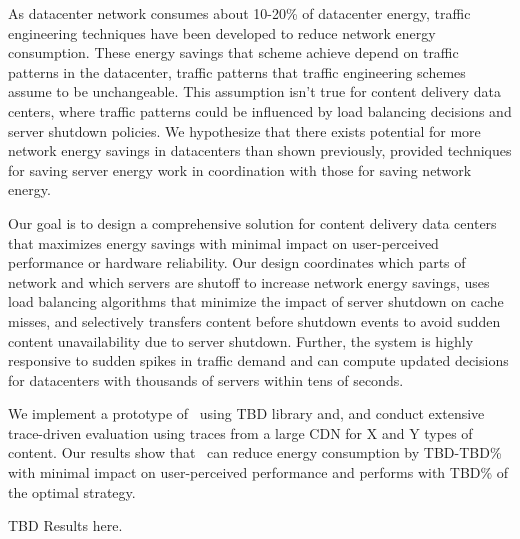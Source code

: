 
As datacenter network consumes about 10-20\% of datacenter energy, traffic engineering techniques have been developed to reduce network energy consumption.  These energy savings that scheme achieve depend on traffic patterns in the datacenter, traffic patterns that traffic engineering schemes assume to be unchangeable.  This assumption isn't true for content delivery data centers, where traffic patterns could be influenced by load balancing decisions and server shutdown policies. We hypothesize that there exists potential for more network energy savings in datacenters than shown previously, provided techniques for saving server energy work in coordination with those for saving network energy. 


Our goal is to design a comprehensive solution for content delivery data centers that maximizes  energy savings with minimal impact on user-perceived performance or hardware reliability. 
Our design coordinates which parts of network and which servers are shutoff to increase network energy savings, uses load balancing algorithms that minimize the impact of server shutdown on cache misses, and selectively transfers  content before shutdown events to avoid sudden content unavailability due to server shutdown. Further, the system is highly responsive to sudden spikes in traffic demand and can compute updated decisions for datacenters with thousands of servers within tens of seconds.


We implement a prototype of \shrink\ using TBD library and, and conduct extensive trace-driven evaluation using traces from a large CDN for X and Y types of content. Our results show that \shrink\ can reduce energy consumption by TBD-TBD\% with minimal impact on user-perceived performance and performs with TBD\% of the optimal strategy. 

TBD Results here.





